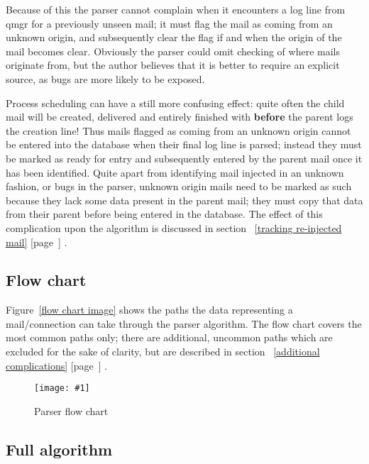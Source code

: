 \documentclass[a4paper,12pt,draft]{article}
\newcommand{\showgraph}[3]{
    \begin{figure}[hbt!]
        \caption{#2}\label{#3}
        \texttt{[image: \#1]}
    \end{figure}
}
\newcommand{\refwithpage}[1]{%
    \empty{}\ref{#1} [page~\pageref{#1}]%
}
\begin{document}
Because of this the parser cannot complain when it encounters a log line
from qmgr for a previously unseen mail; it must flag the mail as coming
from an unknown origin, and subsequently clear the flag if and when the
origin of the mail becomes clear.  Obviously the parser could omit checking
of where mails originate from, but the author believes that it is better to
require an explicit source, as bugs are more likely to be exposed.

Process scheduling can have a still more confusing effect: quite often the
child mail will be created, delivered and entirely finished with
\textbf{before} the parent logs the creation line!  Thus mails flagged as
coming from an unknown origin cannot be entered into the database when
their final log line is parsed; instead they must be marked as ready for
entry and subsequently entered by the parent mail once it has been
identified.  Quite apart from identifying mail injected in an unknown
fashion, or bugs in the parser, unknown origin mails need to be marked as
such because they lack some data present in the parent mail; they must copy
that data from their parent before being entered in the database.  The
effect of this complication upon the algorithm is discussed in
section~\refwithpage{tracking re-injected mail}.



\newpage
\subsection{Flow chart}

\label{flow-chart}

Figure~\ref{flow chart image} shows the paths the data representing a
mail/connection can take through the parser algorithm.  The flow chart
covers the most common paths only; there are additional, uncommon paths
which are excluded for the sake of clarity, but are described in
section~\refwithpage{additional complications}.

\showgraph{build/logparser-flow-chart.ps}{Parser flow chart}{flow chart
image}
\clearpage

\subsection{Full algorithm}
\end{document}
